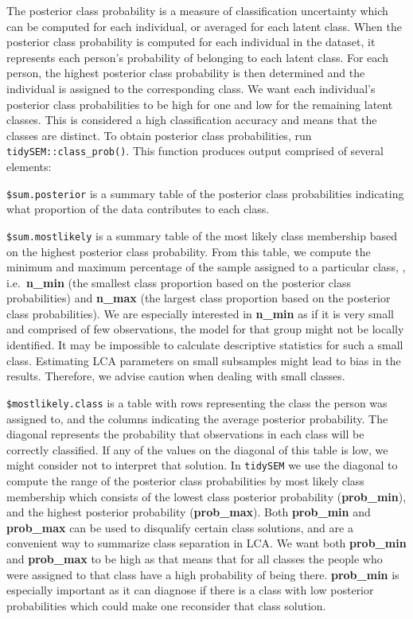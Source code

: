 \documentclass[
  ,man,floatsintext]{apa6}
\begin{document}
The posterior class probability is a measure of classification uncertainty
which can be computed for each individual,
or averaged for each latent class.
When the posterior class probability is computed for each individual in the dataset,
it represents each person's probability of belonging to each latent class.
For each person, the highest posterior class probability is then determined
and the individual is assigned to the corresponding class.
We want each individual's posterior class probabilities to be
high for one and low for the remaining latent classes.
This is considered a high classification accuracy
and means that the classes are distinct.
To obtain posterior class probabilities, run \texttt{tidySEM::class\_prob()}.
This function produces output comprised of several elements:

\texttt{\$sum.posterior} is a summary table of the posterior class probabilities
indicating what proportion of the data contributes to each class.

\texttt{\$sum.mostlikely} is a summary table of the most likely class membership
based on the highest posterior class probability.
From this table, we compute the minimum and maximum
percentage of the sample assigned to a particular class,
, i.e.~\textbf{n\_min}
(the smallest class proportion based on the posterior class probabilities)
and \textbf{n\_max}
(the largest class proportion based on the posterior class probabilities).
We are especially interested in \textbf{n\_min} as
if it is very small and comprised of few observations,
the model for that group might not be locally identified.
It may be impossible to calculate descriptive statistics for such a small class.
Estimating LCA parameters on small subsamples
might lead to bias in the results.
Therefore, we advise caution when dealing with small classes.

\texttt{\$mostlikely.class} is a table with rows representing
the class the person was assigned to,
and the columns indicating the average posterior probability.
The diagonal represents the probability that
observations in each class will be correctly classified.
If any of the values on the diagonal of this table is low,
we might consider not to interpret that solution.
In \texttt{tidySEM} we use the diagonal to compute the range of
the posterior class probabilities by most likely class membership
which consists of
the lowest class posterior probability (\textbf{prob\_min}),
and the highest posterior probability (\textbf{prob\_max}).
Both \textbf{prob\_min} and \textbf{prob\_max} can be used to
disqualify certain class solutions,
and are a convenient way to summarize class separation in LCA.
We want both \textbf{prob\_min} and \textbf{prob\_max} to be high as
that means that for all classes
the people who were assigned to that class
have a high probability of being there.
\textbf{prob\_min} is especially important as it can diagnose
if there is a class with low posterior probabilities
which could make one reconsider that class solution.
\end{document}
